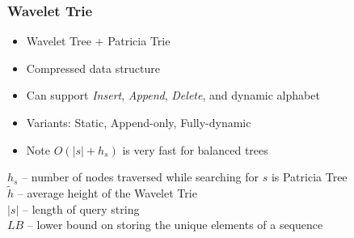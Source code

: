 \documentclass{beamer}
\newcommand{\ra}[1]{\renewcommand{\arraystretch}{#1}}
\begin{document}
\begin{frame}
\frametitle{Wavelet Trie}
\begin{itemize}
  \item Wavelet Tree + Patricia Trie
  \item Compressed data structure
  \item Can support \emph{Insert}, \emph{Append}, \emph{Delete}, and dynamic alphabet
  \item Variants: Static, Append-only, Fully-dynamic
  \item Note $O(|s|+h_s)$ is very fast for balanced trees
\end{itemize}
\begin{table}[h]
    \centering
    \ra{1.3}
\end{table}
{\small
$h_s$ -- number of nodes traversed while searching for $s$ is Patricia Tree\\
$\tilde{h}$ -- average height of the Wavelet Trie\\
$|s|$ -- length of query string\\
$LB$ -- lower bound on storing the unique elements of a sequence 
}
\end{frame}
\end{document}
